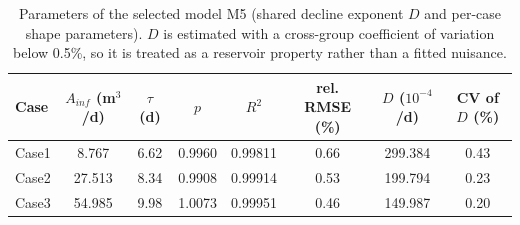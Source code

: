 \begin{table}[htbp]
\centering
\caption{Parameters of the selected model M5 (shared decline exponent $D$ and per-case shape parameters). $D$ is estimated with a cross-group coefficient of variation below 0.5\%, so it is treated as a reservoir property rather than a fitted nuisance.}
\label{tab:m5}
\small
\begin{tabular}{@{}lccccccc@{}}
\toprule
Case & $A_{inf}$ (m$^3$/d) & $\tau$ (d) & $p$ & $R^2$ & rel. RMSE (\%) & $D$ ($10^{-4}$/d) & CV of $D$ (\%) \\
\midrule
Case1 & 8.767 & 6.62 & 0.9960 & 0.99811 & 0.66 & 299.384 & 0.43 \\
Case2 & 27.513 & 8.34 & 0.9908 & 0.99914 & 0.53 & 199.794 & 0.23 \\
Case3 & 54.985 & 9.98 & 1.0073 & 0.99951 & 0.46 & 149.987 & 0.20 \\
\bottomrule
\end{tabular}
\end{table}

